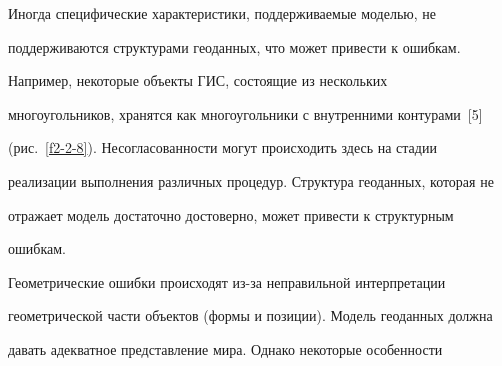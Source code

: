 




\noindent


 Иногда специфические характеристики, поддерживаемые моделью, не 


поддерживаются структурами геоданных, что может привести к ошибкам. 


Например, некоторые объекты ГИС, состоящие из нескольких 


многоугольников, хранятся как многоугольники с внутренними контурами~[5] 


(рис.~\ref{f2-2-8}). Несогласованности могут происходить здесь на стадии 


реализации выполнения различных процедур. Структура геоданных, которая не 


отражает модель достаточно достоверно, может привести к структурным 


ошибкам. 


    





    


    Геометрические ошибки происходят из-за неправильной интерпретации 


геометрической части объектов (формы и позиции). Модель геоданных должна 


давать адекватное представление мира. Однако некоторые особенности 


